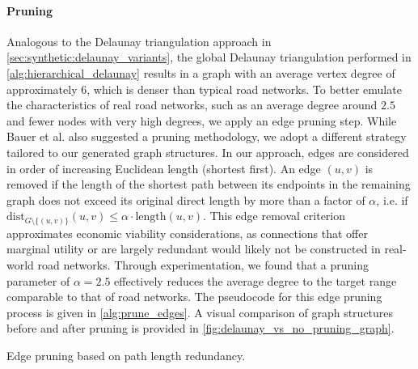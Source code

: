 \paragraph{Pruning}
\label{sec:synthetic:hierarchical_delaunay:pruning}


Analogous to the Delaunay triangulation approach in \cref{sec:synthetic:delaunay_variants}, the global Delaunay triangulation performed in \cref{alg:hierarchical_delaunay} results in a graph with an average vertex degree of approximately 6, which is denser than typical road networks.
To better emulate the characteristics of real road networks, such as an average degree around \(2.5\) and fewer nodes with very high degrees, we apply an edge pruning step.
While Bauer et al. \cite{hutchison_synthetic_2010} also suggested a pruning methodology, we adopt a different strategy tailored to our generated graph structures.
In our approach, edges are considered in order of increasing Euclidean length (shortest first).
An edge \((u,v)\) is removed if the length of the shortest path between its endpoints in the remaining graph does not exceed its original direct length by more than a factor of \(\alpha\), i.e. if \( \text{dist}_{G \setminus \{(u,v)\}}(u,v) \le \alpha \cdot \text{length}(u,v) \).
This edge removal criterion approximates economic viability considerations, as connections that offer marginal utility or are largely redundant would likely not be constructed in real-world road networks.
Through experimentation, we found that a pruning parameter of \(\alpha = 2.5\) effectively reduces the average degree to the target range comparable to that of road networks.
The pseudocode for this edge pruning process is given in \cref{alg:prune_edges}.
A visual comparison of graph structures before and after pruning is provided in \cref{fig:delaunay_vs_no_pruning_graph}.
\begin{algorithm}[tbhp]
	\BlankLine
	\caption{Edge pruning based on path length redundancy.}
	\label{alg:prune_edges}
\end{algorithm}

